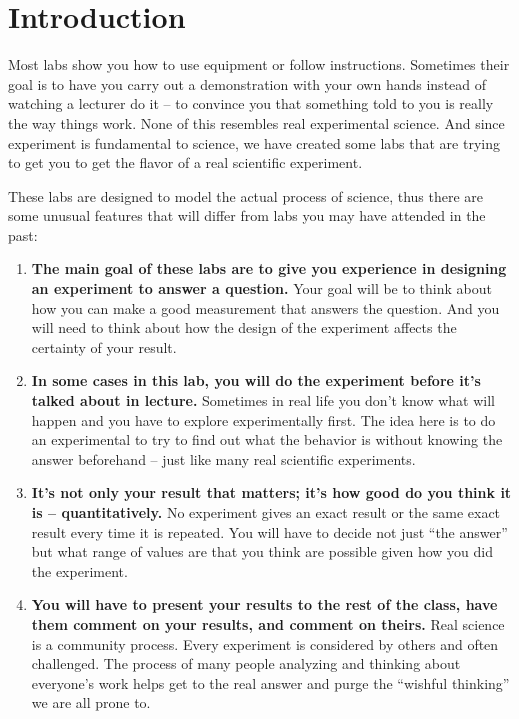 \clearpage
\setcounter{page}{1}

\chapter*{Introduction}
\thispagestyle{fancy}
Most labs show you how to use equipment or follow instructions.
Sometimes their goal is to have you carry out a demonstration with your own hands instead of watching a lecturer do it – to convince you that something told to you is really the way things work.
None of this resembles real experimental science.
And since experiment is fundamental to science, we have created some labs that are trying to get you to get the flavor of a real scientific experiment. \par
These labs are designed to model the actual process of science, thus there are some unusual features that will differ from labs you may have attended in the past:
\begin{enumerate}
\item \textbf{The main goal of these labs are to give you experience in designing an
experiment to answer a question.} Your goal will be to think about how you can
make a good measurement that answers the question. And you will need to think
about how the design of the experiment affects the certainty of your result.
\item \textbf{In some cases in this lab, you will do the experiment before it’s talked about
in lecture.} Sometimes in real life you don’t know what will happen and you have to
explore experimentally first. The idea here is to do an experimental to try to find out
what the behavior is without knowing the answer beforehand – just like many real
scientific experiments.
\item \textbf{It's not only your result that matters; it’s how good do you think it is –
quantitatively.} No experiment gives an exact result or the same exact result every
time it is repeated. You will have to decide not just ``the answer'' but what range of
values are that you think are possible given how you did the experiment.
\item \textbf{You will have to present your results to the rest of the class, have them
comment on your results, and comment on theirs.} Real science is a community
process. Every experiment is considered by others and often challenged. The process
of many people analyzing and thinking about everyone's work helps get to the real
answer and purge the ``wishful thinking'' we are all prone to.
\end{enumerate}

